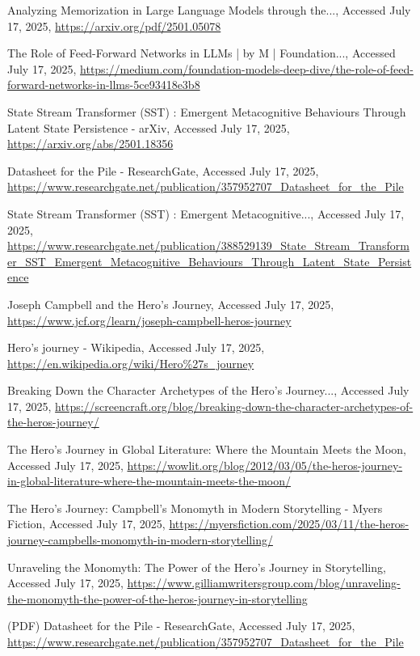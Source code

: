 \documentclass[10pt,twocolumn]{article}
\begin{document}
\begin{thebibliography}{68}
Analyzing Memorization in Large Language Models through the..., Accessed July 17, 2025, \url{https://arxiv.org/pdf/2501.05078}

The Role of Feed-Forward Networks in LLMs | by M | Foundation..., Accessed July 17, 2025, \url{https://medium.com/foundation-models-deep-dive/the-role-of-feed-forward-networks-in-llms-5ce93418e3b8}

State Stream Transformer (SST) : Emergent Metacognitive Behaviours Through Latent State Persistence - arXiv, Accessed July 17, 2025, \url{https://arxiv.org/abs/2501.18356}

Datasheet for the Pile - ResearchGate, Accessed July 17, 2025, \url{https://www.researchgate.net/publication/357952707_Datasheet_for_the_Pile}

State Stream Transformer (SST) : Emergent Metacognitive..., Accessed July 17, 2025, \url{https://www.researchgate.net/publication/388529139_State_Stream_Transformer_SST_Emergent_Metacognitive_Behaviours_Through_Latent_State_Persistence}

Joseph Campbell and the Hero's Journey, Accessed July 17, 2025, \url{https://www.jcf.org/learn/joseph-campbell-heros-journey}

Hero's journey - Wikipedia, Accessed July 17, 2025, \url{https://en.wikipedia.org/wiki/Hero\%27s_journey}

Breaking Down the Character Archetypes of the Hero's Journey..., Accessed July 17, 2025, \url{https://screencraft.org/blog/breaking-down-the-character-archetypes-of-the-heros-journey/}

The Hero's Journey in Global Literature: Where the Mountain Meets the Moon, Accessed July 17, 2025, \url{https://wowlit.org/blog/2012/03/05/the-heros-journey-in-global-literature-where-the-mountain-meets-the-moon/}

The Hero's Journey: Campbell's Monomyth in Modern Storytelling - Myers Fiction, Accessed July 17, 2025, \url{https://myersfiction.com/2025/03/11/the-heros-journey-campbells-monomyth-in-modern-storytelling/}

Unraveling the Monomyth: The Power of the Hero's Journey in Storytelling, Accessed July 17, 2025, \url{https://www.gilliamwritersgroup.com/blog/unraveling-the-monomyth-the-power-of-the-heros-journey-in-storytelling}

(PDF) Datasheet for the Pile - ResearchGate, Accessed July 17, 2025, \url{https://www.researchgate.net/publication/357952707_Datasheet_for_the_Pile}


\end{thebibliography}
\end{document}
